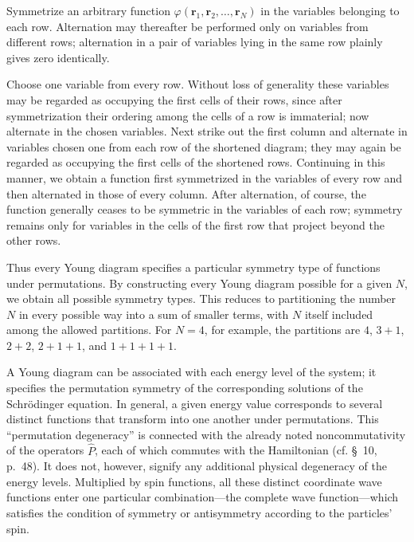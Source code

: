 \begin{figure}[ht]
\centering
{}
\par{}
\end{figure}

Symmetrize an arbitrary function $\varphi(\mathbf r_1,\mathbf r_2,\ldots,\mathbf r_N)$ in the variables belonging to each row. Alternation may thereafter be performed only on variables from different rows; alternation in a pair of variables lying in the same row plainly gives zero identically.

Choose one variable from every row. Without loss of generality these variables may be regarded as occupying the first cells of their rows, since after symmetrization their ordering among the cells of a row is immaterial; now alternate in the chosen variables. Next strike out the first column and alternate in variables chosen one from each row of the shortened diagram; they may again be regarded as occupying the first cells of the shortened rows. Continuing in this manner, we obtain a function first symmetrized in the variables of every row and then alternated in those of every column. After alternation, of course, the function generally ceases to be symmetric in the variables of each row; symmetry remains only for variables in the cells of the first row that project beyond the other rows.



Thus every Young diagram specifies a particular symmetry type of functions under permutations. By constructing every Young diagram possible for a given $N$, we obtain all possible symmetry types. This reduces to partitioning the number $N$ in every possible way into a sum of smaller terms, with $N$ itself included among the allowed partitions. For $N=4$, for example, the partitions are $4$, $3+1$, $2+2$, $2+1+1$, and $1+1+1+1$.

A Young diagram can be associated with each energy level of the system; it specifies the permutation symmetry of the corresponding solutions of the Schrödinger equation. In general, a given energy value corresponds to several distinct functions that transform into one another under permutations. This ``permutation degeneracy'' is connected with the already noted noncommutativity of the operators $\widehat P$, each of which commutes with the Hamiltonian (cf. §~10, p.~48). It does not, however, signify any additional physical degeneracy of the energy levels. Multiplied by spin functions, all these distinct coordinate wave functions enter one particular combination---the complete wave function---which satisfies the condition of symmetry or antisymmetry according to the particles' spin.

